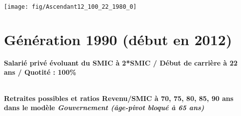  \vspace{0.1cm} 

 {\hspace{-2.2cm}\texttt{[image: fig/Ascendant12\_100\_22\_1980\_0]}} 

\newpage 
 
\section{Génération 1990 (début en 2012)\label{Ascendant12_100_22_1990_0}} 
 
{\bf \noindent Salarié privé évoluant du SMIC à 2*SMIC / Début de carrière à 22 ans / Quotité : 100\%}  ~ 

 ~\\{\bf \noindent Retraites possibles et ratios Revenu/SMIC à 70, 75, 80, 85, 90 ans dans le modèle \emph{Gouvernement (âge-pivot bloqué à 65 ans)}}  
 
